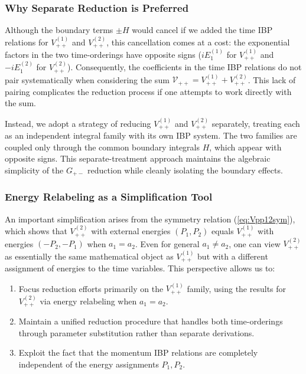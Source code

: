 \documentclass[a4paper,12pt]{article}
\begin{document}
\subsubsection{Why Separate Reduction is Preferred}

Although the boundary terms $\pm H$ would cancel if we added the time IBP relations for $V_{++}^{(1)}$ and $V_{++}^{(2)}$, this cancellation comes at a cost: the exponential factors in the two time-orderings have opposite signs ($iE_1^{(1)}$ for $V_{++}^{(1)}$ and $-iE_1^{(2)}$ for $V_{++}^{(2)}$). Consequently, the coefficients in the time IBP relations do not pair systematically when considering the sum $\mathcal{V}_{++} = V_{++}^{(1)} + V_{++}^{(2)}$. This lack of pairing complicates the reduction process if one attempts to work directly with the sum.

Instead, we adopt a strategy of reducing $V_{++}^{(1)}$ and $V_{++}^{(2)}$ separately, treating each as an independent integral family with its own IBP system. The two families are coupled only through the common boundary integrals $H$, which appear with opposite signs. This separate-treatment approach maintains the algebraic simplicity of the $G_{+-}$ reduction while cleanly isolating the boundary effects.

\subsubsection{Energy Relabeling as a Simplification Tool}

An important simplification arises from the symmetry relation (\ref{eq:Vpp12sym}), which shows that $V_{++}^{(2)}$ with external energies $(P_1, P_2)$ equals $V_{++}^{(1)}$ with energies $(-P_2, -P_1)$ when $a_1=a_2$. Even for general $a_1\neq a_2$, one can view $V_{++}^{(2)}$ as essentially the same mathematical object as $V_{++}^{(1)}$ but with a different assignment of energies to the time variables. This perspective allows us to:

\begin{enumerate}
	\item Focus reduction efforts primarily on the $V_{++}^{(1)}$ family, using the results for $V_{++}^{(2)}$ via energy relabeling when $a_1=a_2$.
	\item Maintain a unified reduction procedure that handles both time-orderings through parameter substitution rather than separate derivations.
	\item Exploit the fact that the momentum IBP relations are completely independent of the energy assignments $P_1, P_2$.
\end{enumerate}
\end{document}
